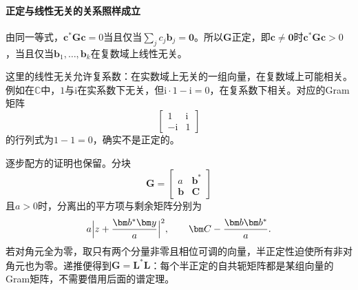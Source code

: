 \paragraph{正定与线性无关的关系照样成立}
由同一等式，$\bm c^*\bm G\bm c=0$当且仅当$\sum_jc_j\bm b_j=\bm0$。所以$\bm G$正定，即$\bm c\neq\bm0$时$\bm c^*\bm G\bm c>0$，当且仅当$\bm b_1,\ldots,\bm b_k$在复数域上线性无关。

这里的线性无关允许复系数：在实数域上无关的一组向量，在复数域上可能相关。例如在$\mathbb C$中，$1$与$\mathrm i$在实系数下无关，但$\mathrm i\cdot1-\mathrm i=0$，在复系数下相关。对应的Gram矩阵
\[
 \begin{bmatrix}1&\mathrm i\\-\mathrm i&1\end{bmatrix}
\]
的行列式为$1-1=0$，确实不是正定的。

逐步配方的证明也保留。分块
\[
 \bm G=\begin{bmatrix}a&\bm b^*\\\bm b&\bm C\end{bmatrix}
\]
且$a>0$时，分离出的平方项与剩余矩阵分别为
\[
 a\Bigl|z+\frac{\bm b^*\bm y}{a}\Bigr|^2,\qquad\bm C-\frac{\bm b\bm b^*}{a}.
\]
若对角元全为零，取只有两个分量非零且相位可调的向量，半正定性迫使所有非对角元也为零。递推便得到$\bm G=\bm L^*\bm L$：每个半正定的自共轭矩阵都是某组向量的Gram矩阵，不需要借用后面的谱定理。

